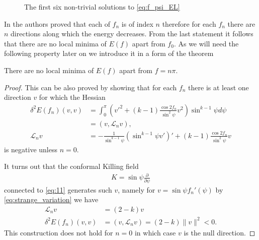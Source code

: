 \begin{figure}[h]
  \centering
  \label{fig:Harmonic_maps}
  
  \caption{The first six non-trivial solutions to \eqref{eq:f_psi_EL}}
\end{figure}

In \cite{Corlette2001} the authors proved that each of $f_n$ is of
index $n$ therefore for each $f_n$ there are $n$ directions along
which the energy decreases. From the last statement it follows that
there are no local minima of $E(f)$ apart from $f_0$. As we will need
the following property later on we introduce it in a form of the
theorem
\begin{theorem}
  \label{thm:harmonic-map-index}
  There are no local minima of $E(f)$ apart from $f=n\pi$.
\end{theorem}
\begin{proof}
  This can be also proved by showing that for each $f_n$ there is at
  least one direction $v$ for which the Hessian
  \begin{align}\label{eq:26}
    \delta^2E(f_n)(v,v) &=\int_0^{\pi} \left(
      v'^2+(k-1)\frac{\cos2f_n}{\sin^2\psi}v^2 \right)\sin^{k-1}\psi
    d\psi\\
    &=(v,\mathcal{L}_n v),\\
    \mathcal{L}_nv&=-\frac{1}{\sin^{k-1}\psi}\left(\sin^{k-1}\psi
      v'\right)'+(k-1)\frac{\cos2f_n}{\sin^2\psi}v
  \end{align}
  is negative unless $n=0$.

  It turns out that the conformal Killing
  field
  \begin{align}
    \label{eq:27}
    K=\sin\psi\frac{\partial}{\partial\psi}
  \end{align}
  connected to \eqref{eq:11} generates such $v$, namely for $v=\sin\psi
  f_n'(\psi)$ by \eqref{eq:strange_variation} we have
  \begin{align}
    \label{eq:28}
    \mathcal{L}_n v&=(2-k)v\\
    \delta^2 E(f_n)(v,v)&=(v,\mathcal{L}_n v)=(2-k)\lVert v\rVert^2<0.
  \end{align}
  This construction does not hold for $n=0$ in which case $v$ is the
  null direction.
\end{proof}

